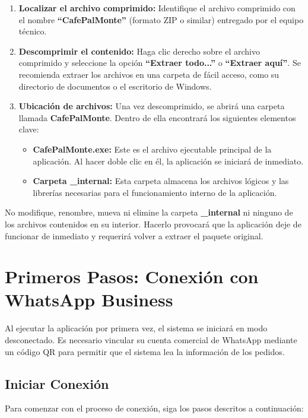\documentclass[11pt,a4paper]{article}
\begin{document}
\begin{enumerate}
    \item \textbf{Localizar el archivo comprimido:} Identifique el archivo comprimido con el nombre \textbf{``CafePalMonte''} (formato ZIP o similar) entregado por el equipo técnico.
    \item \textbf{Descomprimir el contenido:} Haga clic derecho sobre el archivo comprimido y seleccione la opción \textbf{``Extraer todo...''} o \textbf{``Extraer aquí''}. Se recomienda extraer los archivos en una carpeta de fácil acceso, como su directorio de documentos o el escritorio de Windows.
    \item \textbf{Ubicación de archivos:} Una vez descomprimido, se abrirá una carpeta llamada \textbf{CafePalMonte}. Dentro de ella encontrará los siguientes elementos clave:
    \begin{itemize}
        \item \textbf{CafePalMonte.exe:} Este es el archivo ejecutable principal de la aplicación. Al hacer doble clic en él, la aplicación se iniciará de inmediato.
        \item \textbf{Carpeta \_internal:} Esta carpeta almacena los archivos lógicos y las librerías necesarias para el funcionamiento interno de la aplicación.
    \end{itemize}
\end{enumerate}

\begin{advertenciaBox}
No modifique, renombre, mueva ni elimine la carpeta \textbf{\_internal} ni ninguno de los archivos contenidos en su interior. Hacerlo provocará que la aplicación deje de funcionar de inmediato y requerirá volver a extraer el paquete original.
\end{advertenciaBox}

\newpage

\section{Primeros Pasos: Conexión con WhatsApp Business}

Al ejecutar la aplicación por primera vez, el sistema se iniciará en modo desconectado. Es necesario vincular su cuenta comercial de WhatsApp mediante un código QR para permitir que el sistema lea la información de los pedidos.

\subsection{Iniciar Conexión}
Para comenzar con el proceso de conexión, siga los pasos descritos a continuación:
\end{document}

